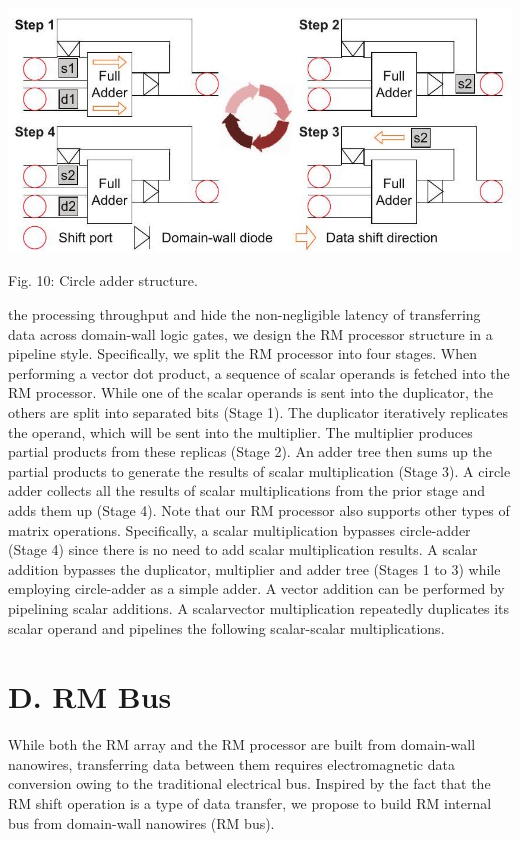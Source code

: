 \documentclass[10pt]{article}
\begin{document}
\begin{center}
\includegraphics[max width=\textwidth]{2024_05_12_abeba8a85da5b5ec4c7bg-06(1)}
\end{center}

Fig. 10: Circle adder structure.

the processing throughput and hide the non-negligible latency of transferring data across domain-wall logic gates, we design the RM processor structure in a pipeline style. Specifically, we split the RM processor into four stages. When performing a vector dot product, a sequence of scalar operands is fetched into the RM processor. While one of the scalar operands is sent into the duplicator, the others are split into separated bits (Stage 1). The duplicator iteratively replicates the operand, which will be sent into the multiplier. The multiplier produces partial products from these replicas (Stage 2). An adder tree then sums up the partial products to generate the results of scalar multiplication (Stage 3). A circle adder collects all the results of scalar multiplications from the prior stage and adds them up (Stage 4). Note that our RM processor also supports other types of matrix operations. Specifically, a scalar multiplication bypasses circle-adder (Stage 4) since there is no need to add scalar multiplication results. A scalar addition bypasses the duplicator, multiplier and adder tree (Stages 1 to 3) while employing circle-adder as a simple adder. A vector addition can be performed by pipelining scalar additions. A scalarvector multiplication repeatedly duplicates its scalar operand and pipelines the following scalar-scalar multiplications.

\section*{D. RM Bus}
While both the RM array and the RM processor are built from domain-wall nanowires, transferring data between them requires electromagnetic data conversion owing to the traditional electrical bus. Inspired by the fact that the RM shift operation is a type of data transfer, we propose to build RM internal bus from domain-wall nanowires (RM bus).
\end{document}
